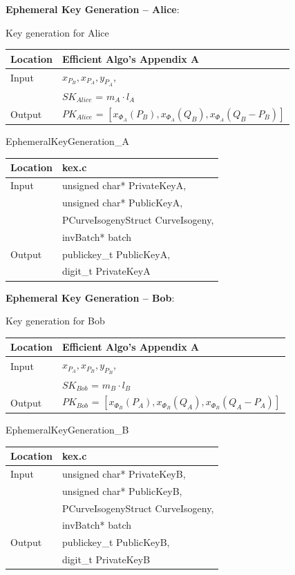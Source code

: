 \textbf{Ephemeral Key Generation -- Alice}:

	\parbox[t]{.35\linewidth}{
	\centering
	Key generation for Alice
	\begin{tabular}{@{}ll@{}}
		\toprule
		Location & Efficient Algo's Appendix A \\
		\midrule
		Input & $x_{P_{B}}, x_{P_{A}}, y_{P_{A}}$,\\
		& $SK_{Alice}$ = $m_{A} \cdot l_{A}$\\
		\midrule
		Output & $PK_{Alice}$ = $[x_{\Phi_{A}}(P_{B}), x_{\Phi_{A}}(Q_{B}), x_{\Phi_{A}}(Q_{B} - P_{B})]$\\
		\bottomrule
	\end{tabular}}
	\hfill
	\parbox[t]{.35\linewidth}{
	\centering
	EphemeralKeyGeneration\_A
	\begin{tabular}{@{}ll@{}}
		\toprule
		Location & kex.c \\
		\midrule
		Input & unsigned char* PrivateKeyA,\\
		& unsigned char* PublicKeyA,\\
		& PCurveIsogenyStruct CurveIsogeny,\\
		& invBatch* batch\\
		\midrule
		Output & publickey\_t PublicKeyA,\\
		& digit\_t PrivateKeyA\\
		\bottomrule
	\end{tabular}}

\textbf{Ephemeral Key Generation -- Bob}:

	\parbox[t]{.35\linewidth}{
	\centering
	Key generation for Bob
	\begin{tabular}{@{}ll@{}}
		\toprule
		Location & Efficient Algo's Appendix A \\
		\midrule
		Input & $x_{P_{A}}, x_{P_{B}}, y_{P_{B}}$,\\
		& $SK_{Bob}$ = $m_{B} \cdot l_{B}$\\
		\midrule
		Output & $PK_{Bob}$ = $[x_{\Phi_{B}}(P_{A}), x_{\Phi_{B}}(Q_{A}), x_{\Phi_{B}}(Q_{A} - P_{A})]$\\
		\bottomrule
	\end{tabular}}
	\hfill
	\parbox[t]{.35\linewidth}{
	\centering
	EphemeralKeyGeneration\_B
	\begin{tabular}{@{}ll@{}}
		\toprule
		Location & kex.c \\
		\midrule
		Input & unsigned char* PrivateKeyB,\\
		& unsigned char* PublicKeyB,\\
		& PCurveIsogenyStruct CurveIsogeny,\\
		& invBatch* batch\\
		\midrule
		Output & publickey\_t PublicKeyB,\\
		& digit\_t PrivateKeyB\\
		\bottomrule
	\end{tabular}}

